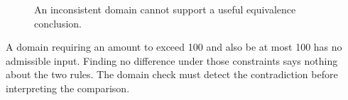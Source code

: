 \begin{figure}[H]
\centering
{}
\caption{An inconsistent domain cannot support a useful equivalence conclusion.}\label{fig:teach-M07-07}
\end{figure}

A domain requiring an amount to exceed 100 and also be at most 100 has no admissible input. Finding no difference under those constraints says nothing about the two rules. The domain check must detect the contradiction before interpreting the comparison.

